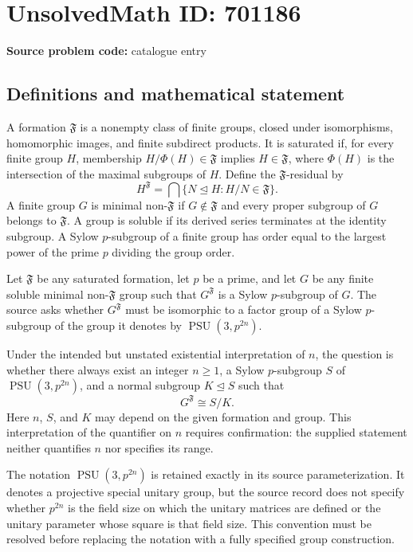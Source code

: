 \documentclass[11pt]{article}
\begin{document}
\section*{UnsolvedMath ID: 701186}
\textbf{Source problem code:} catalogue entry
\subsection{Definitions and mathematical statement}
A formation \(\mathfrak F\) is a nonempty class of finite groups, closed under isomorphisms, homomorphic images, and finite subdirect products. It is saturated if, for every finite group \(H\), membership \(H/\Phi(H)\in\mathfrak F\) implies \(H\in\mathfrak F\), where \(\Phi(H)\) is the intersection of the maximal subgroups of \(H\). Define the \(\mathfrak F\)-residual by
\[
H^{\mathfrak F}=\bigcap\{N\mathrel{\unlhd}H:H/N\in\mathfrak F\}.
\]
A finite group \(G\) is minimal non-\(\mathfrak F\) if \(G\notin\mathfrak F\) and every proper subgroup of \(G\) belongs to \(\mathfrak F\). A group is soluble if its derived series terminates at the identity subgroup. A Sylow \(p\)-subgroup of a finite group has order equal to the largest power of the prime \(p\) dividing the group order.

Let \(\mathfrak F\) be any saturated formation, let \(p\) be a prime, and let \(G\) be any finite soluble minimal non-\(\mathfrak F\) group such that \(G^{\mathfrak F}\) is a Sylow \(p\)-subgroup of \(G\). The source asks whether \(G^{\mathfrak F}\) must be isomorphic to a factor group of a Sylow \(p\)-subgroup of the group it denotes by \(\operatorname{PSU}(3,p^{2n})\).

Under the intended but unstated existential interpretation of \(n\), the question is whether there always exist an integer \(n\geq 1\), a Sylow \(p\)-subgroup \(S\) of \(\operatorname{PSU}(3,p^{2n})\), and a normal subgroup \(K\unlhd S\) such that
\[
G^{\mathfrak F}\cong S/K.
\]
Here \(n\), \(S\), and \(K\) may depend on the given formation and group. This interpretation of the quantifier on \(n\) requires confirmation: the supplied statement neither quantifies \(n\) nor specifies its range.

The notation \(\operatorname{PSU}(3,p^{2n})\) is retained exactly in its source parameterization. It denotes a projective special unitary group, but the source record does not specify whether \(p^{2n}\) is the field size on which the unitary matrices are defined or the unitary parameter whose square is that field size. This convention must be resolved before replacing the notation with a fully specified group construction.
\end{document}

